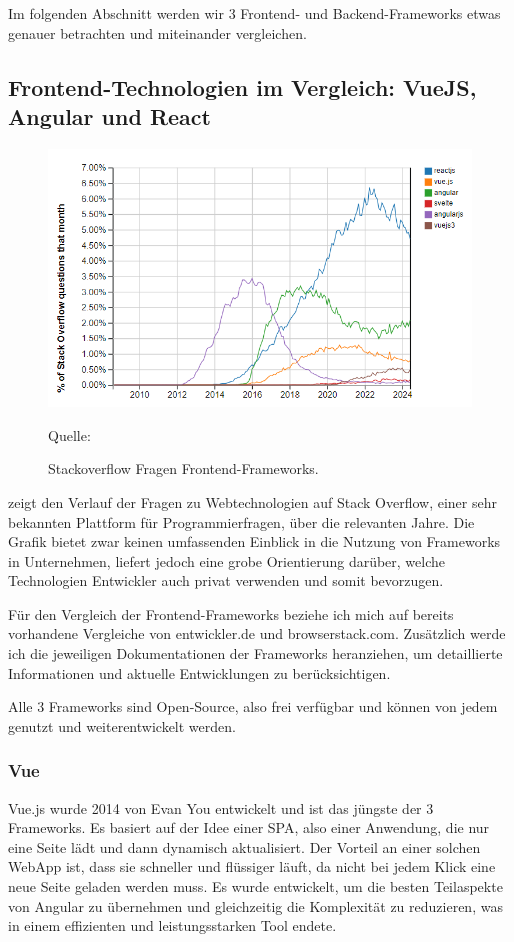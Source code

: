\documentclass[biblatex]{lni}
\begin{document}
Im folgenden Abschnitt werden wir 3 Frontend- und Backend-Frameworks etwas genauer betrachten und miteinander vergleichen.

\subsection{Frontend-Technologien im Vergleich: VueJS, Angular und React}

\begin{figure}
  \centering
  \includegraphics[width=.8\textwidth]{fetrends}
  \caption{Stackoverflow Fragen Frontend-Frameworks.}
  \label{fig:fetrends}
  \vspace{-0.3cm}
  \begin{center}
    \footnotesize Quelle: \cite{SOTrend}
  \end{center}
\end{figure}

 zeigt den Verlauf der Fragen zu Webtechnologien auf Stack Overflow,
einer sehr bekannten Plattform für Programmierfragen, über die relevanten Jahre.
Die Grafik bietet zwar keinen umfassenden Einblick in die Nutzung von Frameworks in Unternehmen,
liefert jedoch eine grobe Orientierung darüber, welche Technologien Entwickler auch privat verwenden und somit bevorzugen.

Für den Vergleich der Frontend-Frameworks beziehe ich mich auf bereits vorhandene Vergleiche von
entwickler.de und browserstack.com. \cite{BStack} \cite{Dev}
Zusätzlich werde ich die jeweiligen Dokumentationen der Frameworks heranziehen,
um detaillierte Informationen und aktuelle Entwicklungen zu berücksichtigen.

Alle 3 Frameworks sind Open-Source, also frei verfügbar und können von jedem genutzt und weiterentwickelt werden.

\subsubsection{Vue}
Vue.js wurde 2014 von Evan You entwickelt und ist das jüngste der 3 Frameworks. \cite{AmD}
Es basiert auf der Idee einer \ac{SPA}, also einer Anwendung, die nur eine Seite lädt und dann dynamisch aktualisiert. \cite{BStack}
Der Vorteil an einer solchen WebApp ist, dass sie schneller und flüssiger läuft, da nicht bei jedem Klick eine neue Seite geladen werden muss.
Es wurde entwickelt, um die besten Teilaspekte von Angular zu übernehmen und gleichzeitig die Komplexität zu reduzieren,
was in einem effizienten und leistungsstarken Tool endete.
\end{document}
